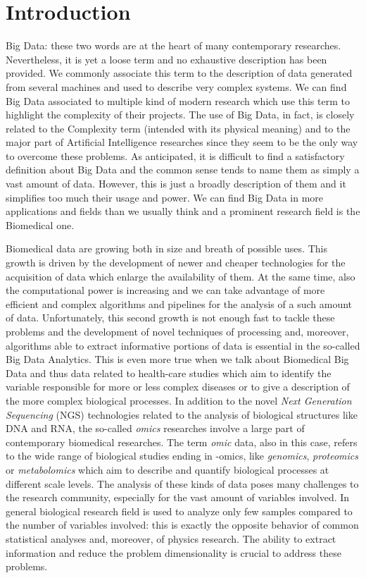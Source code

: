 \documentclass{standalone}
\begin{document}
\chapter*{Introduction}\label{Introduction}

Big Data: these two words are at the heart of many contemporary researches.
Nevertheless, it is yet a loose term and no exhaustive description has been provided.
We commonly associate this term to the description of data generated from several machines and used to describe very complex systems.
We can find Big Data associated to multiple kind of modern research which use this term to highlight the complexity of their projects.
The use of Big Data, in fact, is closely related to the Complexity term (intended with its physical meaning) and to the major part of Artificial Intelligence researches since they seem to be the only way to overcome these problems.
As anticipated, it is difficult to find a satisfactory definition about Big Data and the common sense tends to name them as simply a vast amount of data.
However, this is just a broadly description of them and it simplifies too much their usage and power.
We can find Big Data in more applications and fields than we usually think and a prominent research field is the Biomedical one.

Biomedical data are growing both in size and breath of possible uses.
This growth is driven by the development of newer and cheaper technologies for the acquisition of data which enlarge the availability of them.
At the same time, also the computational power is increasing and we can take advantage of more efficient and complex algorithms and pipelines for the analysis of a such amount of data.
Unfortunately, this second growth is not enough fast to tackle these problems and the development of novel techniques of processing and, moreover, algorithms able to extract informative portions of data is essential in the so-called Big Data Analytics.
This is even more true when we talk about Biomedical Big Data and thus data related to health-care studies which aim to identify the variable responsible for more or less complex diseases or to give a description of the more complex biological processes.
In addition to the novel \emph{Next Generation Sequencing} (NGS) technologies related to the analysis of biological structures like DNA and RNA, the so-called \emph{omics} researches involve a large part of contemporary biomedical researches.
The term \emph{omic} data, also in this case, refers to the wide range of biological studies ending in -omics, like \emph{genomics}, \emph{proteomics} or \emph{metabolomics} which aim to describe and quantify biological processes at different scale levels.
The analysis of these kinds of data poses many challenges to the research community, especially for the vast amount of variables involved.
In general biological research field is used to analyze only few samples compared to the number of variables involved: this is exactly the opposite behavior of common statistical analyses and, moreover, of physics research.
The ability to extract information and reduce the problem dimensionality is crucial to address these problems.
\end{document}
